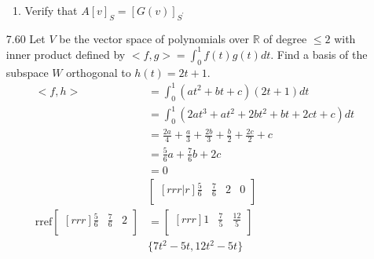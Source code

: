 \documentclass[12pt]{article}
\theoremstyle{definition}
\theoremstyle{plain}
\begin{document}
\begin{enumerate}
\begin{enumerate}
	\item Verify that $A[v]_S=[G(v)]_{S^\prime}$
	\end{enumerate}
\item[7.60]Let $V$ be the vector space of polynomials over $\mathbb{R}$ of degree $\leq 2$ with inner product defined by $<f,g>=\int_0^1f(t)g(t)dt$. Find a basis of the subspace $W$ orthogonal to $h(t)=2t+1$.\\
	\begin{align*}
	<f,h>&=\int_0^1(at^2+bt+c)(2t+1)dt\\
	&= \int_0^1(2at^3+at^2+2bt^2+bt+2ct+c)dt\\
	&= \frac{2a}{4}+\frac{a}{3}+\frac{2b}{3}+\frac{b}{2}+\frac{2c}{2}+c\\
	&= \frac{5}{6}a+\frac{7}{6}b+2c\\
	&= 0\\
	&\begin{bmatrix}[rrr|r]\frac{5}{6}&\frac{7}{6}&2&0\\\end{bmatrix}\\
	\mathrm{rref}\begin{bmatrix}[rrr]\frac{5}{6}&\frac{7}{6}&2\\\end{bmatrix} &= \begin{bmatrix}[rrr]1&\frac{7}{5}&\frac{12}{5}\\\end{bmatrix}\\
	&\{7t^2-5t,12t^2-5t\}
	\end{align*}
	

\end{enumerate}
\end{document}
